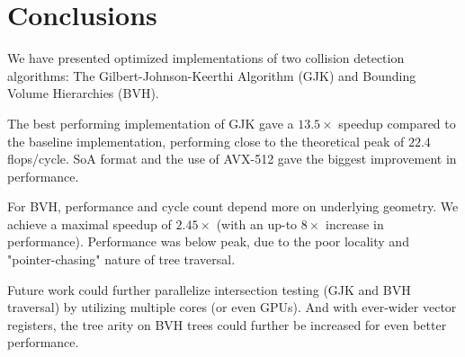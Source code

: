 \documentclass[twocolumn]{article}
\begin{document}

\section{Conclusions}
We have presented optimized implementations of two collision detection algorithms:  The Gilbert-Johnson-Keerthi Algorithm (GJK) and Bounding Volume Hierarchies (BVH).

The best performing implementation of GJK gave a $13.5\times$ speedup compared to the baseline implementation, performing close to the theoretical peak of $22.4$ flops/cycle. SoA format and the use of AVX-512 gave the biggest improvement in performance.

For BVH, performance and cycle count depend more on underlying geometry. We achieve a maximal speedup of $2.45\times$ (with an up-to $8\times$ increase in performance).
Performance was below peak, due to the poor locality and "pointer-chasing" nature of tree traversal.

Future work could further parallelize intersection testing (GJK and BVH traversal) by utilizing multiple cores (or even GPUs).
And with ever-wider vector registers, the tree arity on BVH trees could further be increased for even better performance.
\end{document}
